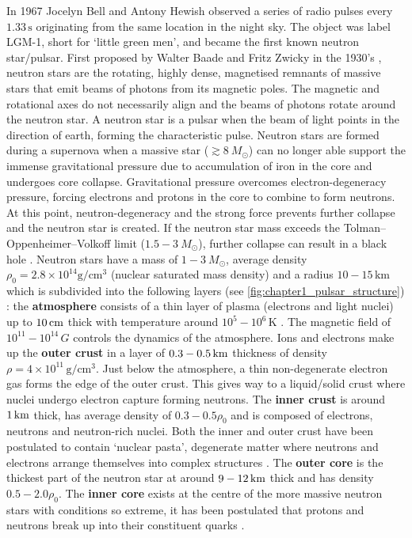 In 1967 Jocelyn Bell and Antony Hewish observed a series of radio pulses every $1.33\,\si{\second}$ originating from the same location in the night sky. The object was label LGM-1, short for `little green men', and became the first known neutron star/pulsar. First proposed by Walter Baade and Fritz Zwicky in the 1930's \citep{1934PhRv...46...76B}, neutron stars are the rotating, highly dense, magnetised remnants of massive stars that emit beams of photons from its magnetic poles. The magnetic and rotational axes do not necessarily align and the beams of photons rotate around the neutron star. A neutron star is a pulsar when the beam of light points in the direction of earth, forming the characteristic pulse.
\newpar
Neutron stars are formed during a supernova when a massive star ($\gtrsim 8~M_\odot$) can no longer able support the immense gravitational pressure due to accumulation of iron in the core and undergoes core collapse. Gravitational pressure overcomes electron-degeneracy pressure, forcing electrons and protons in the core to combine to form neutrons. At this point, neutron-degeneracy and the strong force prevents further collapse and the neutron star is created. If the neutron star mass exceeds the Tolman–Oppenheimer–Volkoff limit ($1.5-3~M_\odot$), further collapse can result in a black hole \citep{1996A&A...305..871B, 2015SSRv..188..187S}.
\newpar
Neutron stars have a mass of $1-3~M_\odot$, average density $\rho_0=2.8\times 10^{14}\si{\gram\per\centi\meter\cubed}$ (nuclear saturated mass density) and a radius $10-15\,\si{\kilo\meter}$ which is subdivided into the following layers (see \autoref{fig:chapter1_pulsar_structure}) \citep{2007ASSL..326.....H}: the \textbf{atmosphere} consists of a thin layer of plasma (electrons and light nuclei) up to $10\,\si{\centi\meter}$ thick with temperature around $10^5-10^6\,\si{\kelvin}$ \citep{2002nsps.conf..263Z}. The magnetic field of $10^{11}-10^{14}\,\si{G}$ controls the dynamics of the atmosphere. Ions and electrons make up the \textbf{outer crust} in a layer of $0.3-0.5\,\si{\kilo\meter}$ thickness of density $\rho=4\times 10^{11}\,\si{\gram\per\centi\meter\cubed}$. Just below the atmosphere, a thin non-degenerate electron gas forms the edge of the outer crust. This gives way to a liquid/solid crust where nuclei undergo electron capture forming neutrons. The \textbf{inner crust} is around $1\,\si{\kilo\meter}$ thick, has average density of $0.3-0.5\rho_0$ and is composed of electrons, neutrons and neutron-rich nuclei. Both the inner and outer crust have been postulated to contain `nuclear pasta', degenerate matter where neutrons and electrons arrange themselves into complex structures \citep{PhysRevC.88.065807}. The \textbf{outer core} is the thickest part of the neutron star at around $9-12\,\si{\kilo\meter}$ thick and has density $0.5-2.0\rho_0$. The \textbf{inner core} exists at the centre of the more massive neutron stars with conditions so extreme, it has been postulated that protons and neutrons break up into their constituent quarks \citep{2007ASSL..326.....H}.
